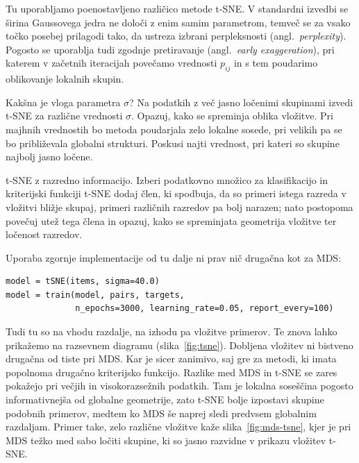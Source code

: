 Tu uporabljamo poenostavljeno različico metode t-SNE. V standardni izvedbi se širina Gaussovega jedra ne določi z enim samim parametrom, temveč se za vsako točko posebej prilagodi tako, da ustreza izbrani perpleksnosti (angl.~\emph{perplexity}). Pogosto se uporablja tudi zgodnje pretiravanje (angl.~\emph{early exaggeration}), pri katerem v začetnih iteracijah povečamo vrednosti $p_{ij}$ in s tem poudarimo oblikovanje lokalnih skupin.

\begin{exercise}{Kakšna je vloga parametra $\sigma$?}
Na podatkih z več jasno ločenimi skupinami izvedi t-SNE za različne vrednosti $\sigma$. Opazuj, kako se spreminja oblika vložitve. Pri majhnih vrednostih bo metoda poudarjala zelo lokalne sosede, pri velikih pa se bo približevala globalni strukturi. Poskusi najti vrednost, pri kateri so skupine najbolj jasno ločene.
\end{exercise}

\begin{exercise}{t-SNE z razredno informacijo.}
Izberi podatkovno množico za klasifikacijo in kriterijski funkciji t-SNE dodaj člen, ki spodbuja, da so primeri istega razreda v vložitvi bližje skupaj, primeri različnih razredov pa bolj narazen; nato postopoma povečuj utež tega člena in opazuj, kako se spreminjata geometrija vložitve ter ločenost razredov.
\end{exercise}

Uporaba zgornje implementacije od tu dalje ni prav nič drugačna kot za MDS:
\vspace*{3mm}
\begin{lstlisting}
model = tSNE(items, sigma=40.0)
model = train(model, pairs, targets, 
              n_epochs=3000, learning_rate=0.05, report_every=100)
\end{lstlisting}
Tudi tu so na vhodu razdalje, na izhodu pa vložitve primerov. Te znova lahko prikažemo na razsevnem diagramu (slika~\ref{fig:tsne}). Dobljena vložitev ni bistveno drugačna od tiste pri MDS. Kar je sicer zanimivo, saj gre za metodi, ki imata popolnoma drugačno kriterijsko funkcijo. Razlike med MDS in t-SNE se zares pokažejo pri večjih in visokorazsežnih podatkih. Tam je lokalna soseščina pogosto informativnejša od globalne geometrije, zato t-SNE bolje izpostavi skupine podobnih primerov, medtem ko MDS še naprej sledi predvsem globalnim razdaljam. Primer take, zelo različne vložitve kaže slika~\ref{fig:mds-tsne}, kjer je pri MDS težko med sabo ločiti skupine, ki so jasno razvidne v prikazu vložitev t-SNE.

